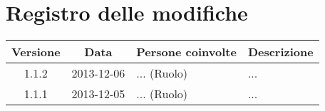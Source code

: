 \section*{Registro delle modifiche}

\small{
\begin{tabularx}{\textwidth}{|c|c|l|X|}
 \hline \textbf{Versione} & \textbf{Data} & \textbf{Persone coinvolte} & \textbf{Descrizione} \\

 
 \hline 1.1.2 & 2013-12-06 & ... (Ruolo) &
 ...\\
 
 \hline 1.1.1 & 2013-12-05 & ... (Ruolo) &
 ...\\
 
 \hline
\end{tabularx}
}